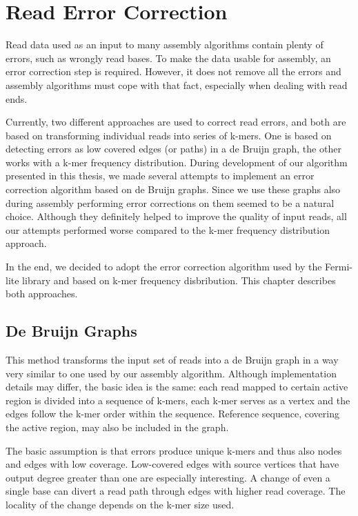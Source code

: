 \chapter{Read Error Correction}
\label{chap:read-error-correction}

Read data used as an input to many assembly algorithms contain plenty of errors, such as wrongly read bases. To make the data usable for assembly, an error correction step is required. However, it does not remove all the errors and assembly algorithms must cope with that fact, especially when dealing with read ends.

Currently, two different approaches are used to correct read errors, and both are based on transforming individual reads into series of k-mers. One is based on detecting errors as low covered edges (or paths) in a de Bruijn graph, the other works with a k-mer frequency distribution. During development of our algorithm presented in this thesis, we made several attempts to implement an error correction algorithm based on de Bruijn graphs. Since we use these graphs also during assembly performing error corrections on them seemed to be a natural choice. Although they definitely helped to improve the quality of input reads, all our attempts performed worse compared to the k-mer frequency distribution approach.

In the end, we decided to adopt the error correction algorithm used by the Fermi-lite library \cite{fermi-lite} and based on k-mer frequency disbribution. This chapter describes both approaches.

\section{De Bruijn Graphs}
\label{sec:ec-de-bruin-graphs}

This method transforms the input set of reads into a de Bruijn graph in a way very similar to one used by our assembly algorithm. Although implementation details may differ, the basic idea is the same: each read mapped to certain active region is divided into a sequence of k-mers, each k-mer serves as a vertex and the edges follow the k-mer order within the sequence. Reference sequence, covering the active region, may also be included in the graph.

The basic assumption is that errors produce unique k-mers and thus also
nodes and edges with low coverage. Low-covered edges with source vertices that have output degree greater than one are especially interesting. A change of even a single base can divert a read path through edges with higher read coverage. The locality of the change depends on the k-mer size used.

